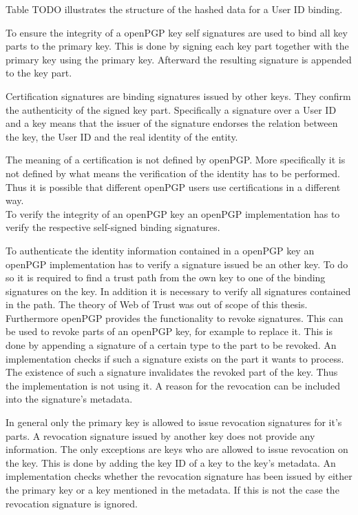 Table TODO illustrates the structure of the hashed data for a User ID binding.


To ensure the integrity of a openPGP key self signatures are used to bind all key parts to the primary key. This is done by signing each key part together with the primary key using the primary key. Afterward the resulting signature is appended to the key part.

Certification signatures are binding signatures issued by other keys. They confirm the authenticity of the signed key part. Specifically a signature over a User ID and a key means that the issuer of the signature endorses the relation between the key, the User ID and the real identity of the entity.

The meaning of a certification is not defined by openPGP. More specifically it is not defined by what means the verification of the identity has to be performed. Thus it is possible that different openPGP users use certifications in a different way. \\

To verify the integrity of an openPGP key an openPGP implementation has to verify the respective self-signed binding signatures. 

To authenticate the identity information contained in a openPGP key an openPGP implementation has to verify a signature issued be an other key. To do so it is required to find a trust path from the own key to one of the binding signatures on the key. In addition it is necessary to verify all signatures contained in the path. The theory of Web of Trust was out of scope of this thesis. \\

Furthermore openPGP provides the functionality to revoke signatures. This can be used to revoke parts of an openPGP key, for example to replace it. This is done by appending a signature of a certain type to the part to be revoked. An implementation checks if such a signature exists on the part it wants to process. The existence of such a signature invalidates the revoked part of the key. Thus the implementation is not using it. A reason for the revocation can be included into the signature's metadata. 

In general only the primary key is allowed to issue revocation signatures for it's parts. A revocation signature issued by another key does not provide any information. The only exceptions are keys who are allowed to issue revocation on the key. This is done by adding the key ID of a key to the key's metadata. An implementation checks whether the revocation signature has been issued by either the primary key or a key mentioned in the metadata. If this is not the case the revocation signature is ignored.

